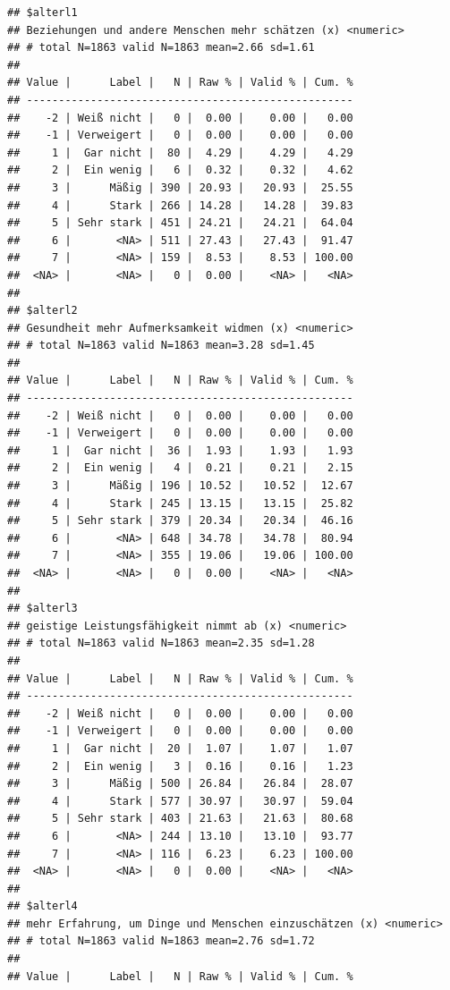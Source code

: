 \documentclass[
  doc]{apa6}
\begin{document}
\begin{verbatim}
## $alterl1
## Beziehungen und andere Menschen mehr schätzen (x) <numeric> 
## # total N=1863 valid N=1863 mean=2.66 sd=1.61
## 
## Value |      Label |   N | Raw % | Valid % | Cum. %
## ---------------------------------------------------
##    -2 | Weiß nicht |   0 |  0.00 |    0.00 |   0.00
##    -1 | Verweigert |   0 |  0.00 |    0.00 |   0.00
##     1 |  Gar nicht |  80 |  4.29 |    4.29 |   4.29
##     2 |  Ein wenig |   6 |  0.32 |    0.32 |   4.62
##     3 |      Mäßig | 390 | 20.93 |   20.93 |  25.55
##     4 |      Stark | 266 | 14.28 |   14.28 |  39.83
##     5 | Sehr stark | 451 | 24.21 |   24.21 |  64.04
##     6 |       <NA> | 511 | 27.43 |   27.43 |  91.47
##     7 |       <NA> | 159 |  8.53 |    8.53 | 100.00
##  <NA> |       <NA> |   0 |  0.00 |    <NA> |   <NA>
## 
## $alterl2
## Gesundheit mehr Aufmerksamkeit widmen (x) <numeric> 
## # total N=1863 valid N=1863 mean=3.28 sd=1.45
## 
## Value |      Label |   N | Raw % | Valid % | Cum. %
## ---------------------------------------------------
##    -2 | Weiß nicht |   0 |  0.00 |    0.00 |   0.00
##    -1 | Verweigert |   0 |  0.00 |    0.00 |   0.00
##     1 |  Gar nicht |  36 |  1.93 |    1.93 |   1.93
##     2 |  Ein wenig |   4 |  0.21 |    0.21 |   2.15
##     3 |      Mäßig | 196 | 10.52 |   10.52 |  12.67
##     4 |      Stark | 245 | 13.15 |   13.15 |  25.82
##     5 | Sehr stark | 379 | 20.34 |   20.34 |  46.16
##     6 |       <NA> | 648 | 34.78 |   34.78 |  80.94
##     7 |       <NA> | 355 | 19.06 |   19.06 | 100.00
##  <NA> |       <NA> |   0 |  0.00 |    <NA> |   <NA>
## 
## $alterl3
## geistige Leistungsfähigkeit nimmt ab (x) <numeric> 
## # total N=1863 valid N=1863 mean=2.35 sd=1.28
## 
## Value |      Label |   N | Raw % | Valid % | Cum. %
## ---------------------------------------------------
##    -2 | Weiß nicht |   0 |  0.00 |    0.00 |   0.00
##    -1 | Verweigert |   0 |  0.00 |    0.00 |   0.00
##     1 |  Gar nicht |  20 |  1.07 |    1.07 |   1.07
##     2 |  Ein wenig |   3 |  0.16 |    0.16 |   1.23
##     3 |      Mäßig | 500 | 26.84 |   26.84 |  28.07
##     4 |      Stark | 577 | 30.97 |   30.97 |  59.04
##     5 | Sehr stark | 403 | 21.63 |   21.63 |  80.68
##     6 |       <NA> | 244 | 13.10 |   13.10 |  93.77
##     7 |       <NA> | 116 |  6.23 |    6.23 | 100.00
##  <NA> |       <NA> |   0 |  0.00 |    <NA> |   <NA>
## 
## $alterl4
## mehr Erfahrung, um Dinge und Menschen einzuschätzen (x) <numeric> 
## # total N=1863 valid N=1863 mean=2.76 sd=1.72
## 
## Value |      Label |   N | Raw % | Valid % | Cum. %

\end{verbatim}
\end{document}
